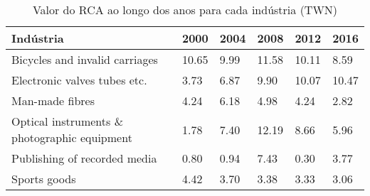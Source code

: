 \begin{table}
\centering
\caption{Valor do RCA ao longo dos anos para cada indústria (TWN)}
\begin{tabular}{p{6cm}p{1.5cm}p{1.5cm}p{1.5cm}p{1.5cm}p{1.5cm}}
\toprule
                                   Indústria &  2000 & 2004 &  2008 &  2012 &  2016 \\
\midrule
              Bicycles and invalid carriages & 10.65 & 9.99 & 11.58 & 10.11 &  8.59 \\
                Electronic valves tubes etc. &  3.73 & 6.87 &  9.90 & 10.07 & 10.47 \\
                             Man-made fibres &  4.24 & 6.18 &  4.98 &  4.24 &  2.82 \\
Optical instruments \& photographic equipment &  1.78 & 7.40 & 12.19 &  8.66 &  5.96 \\
                Publishing of recorded media &  0.80 & 0.94 &  7.43 &  0.30 &  3.77 \\
                                Sports goods &  4.42 & 3.70 &  3.38 &  3.33 &  3.06 \\
\bottomrule
\end{tabular}
\end{table}
